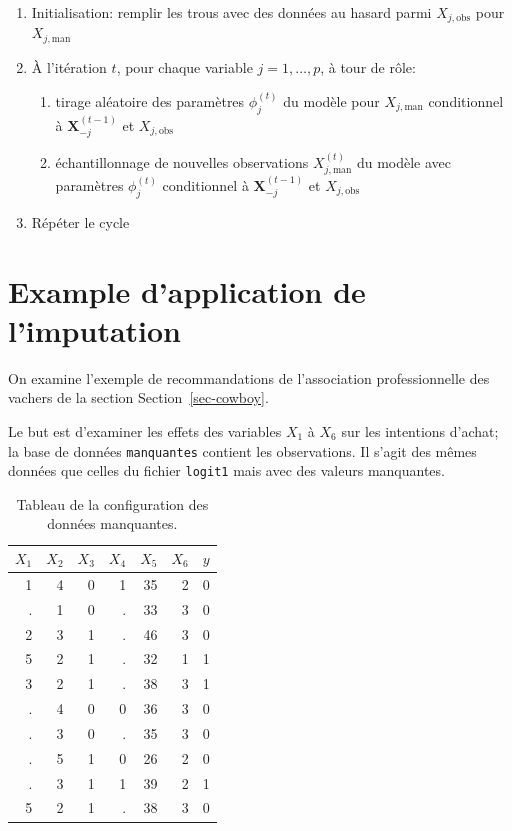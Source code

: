\documentclass[
  11pt,
  letterpaper,
]{scrbook}
\providecommand{\tightlist}{%
  \setlength{\itemsep}{0pt}\setlength{\parskip}{0pt}}\usepackage{longtable,booktabs,array}
\theoremstyle{definition}
\theoremstyle{remark}
\begin{document}
\begin{enumerate}
\def\labelenumi{\arabic{enumi}.}
\tightlist
\item
  Initialisation: remplir les trous avec des données au hasard parmi
  \(X_{j, \text{obs}}\) pour \(X_{j, \text{man}}\)
\item
  À l'itération \(t\), pour chaque variable \(j=1, \ldots, p\), à tour
  de rôle:

  \begin{enumerate}
  \def\labelenumii{\alph{enumii})}
  \tightlist
  \item
    tirage aléatoire des paramètres \(\phi_j^{(t)}\) du modèle pour
    \(X_{j,\text{man}}\) conditionnel à \(\boldsymbol{X}_{-j}^{(t-1)}\)
    et \(X_{j, \text{obs}}\)
  \item
    échantillonnage de nouvelles observations \(X^{(t)}_{j,\text{man}}\)
    du modèle avec paramètres \(\phi_j^{(t)}\) conditionnel à
    \(\boldsymbol{X}_{-j}^{(t-1)}\) et \(X_{j, \text{obs}}\)
  \end{enumerate}
\item
  Répéter le cycle
\end{enumerate}

\hypertarget{example-dapplication-de-limputation}{%
\section{Example d'application de
l'imputation}\label{example-dapplication-de-limputation}}

On examine l'exemple de recommandations de l'association professionnelle
des vachers de la section Section~\ref{sec-cowboy}.

Le but est d'examiner les effets des variables \(X_1\) à \(X_6\) sur les
intentions d'achat; la base de données \texttt{manquantes} contient les
observations. Il s'agit des mêmes données que celles du fichier
\texttt{logit1} mais avec des valeurs manquantes.

\hypertarget{tbl-missing1r}{}
\begin{table}
\caption{\label{tbl-missing1r}Tableau de la configuration des données manquantes. }\tabularnewline

\centering
\begin{tabular}{rrrrrrr}
\toprule
\(X_1\) & \(X_2\) & \(X_3\) & \(X_4\) & \(X_5\) & \(X_6\) & \(y\)\\
\midrule
1 & 4 & 0 & 1 & 35 & 2 & 0\\
. & 1 & 0 & . & 33 & 3 & 0\\
2 & 3 & 1 & . & 46 & 3 & 0\\
5 & 2 & 1 & . & 32 & 1 & 1\\
3 & 2 & 1 & . & 38 & 3 & 1\\
\addlinespace
. & 4 & 0 & 0 & 36 & 3 & 0\\
. & 3 & 0 & . & 35 & 3 & 0\\
. & 5 & 1 & 0 & 26 & 2 & 0\\
. & 3 & 1 & 1 & 39 & 2 & 1\\
5 & 2 & 1 & . & 38 & 3 & 0\\
\bottomrule
\end{tabular}
\end{table}
\end{document}

